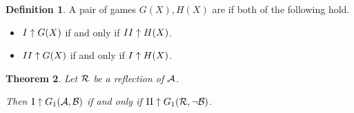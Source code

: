 \documentclass{amsart}
\theoremstyle{plain}
\newtheorem{theorem}{Theorem}
\theoremstyle{definition}
\newtheorem{definition}[theorem]{Definition}
\theoremstyle{remark}
\theoremstyle{plain}
\theoremstyle{definition}
\theoremstyle{remark}
\begin{document}
\begin{definition}
  A pair of games \(G(X),H(X)\) are  if both
  of the following hold.
  \begin{itemize}
    \item \(I\uparrow G(X)\) if and only if \(II\uparrow H(X)\).
    \item \(II\uparrow G(X)\) if and only if \(I\uparrow H(X)\).
  \end{itemize}
\end{definition}

\begin{theorem}
  Let \(\mathcal{R}\) be a reflection of \(\mathcal{A}\). 

  Then
  \(\mathrm{I}\uparrow G_{1}(\mathcal{A},\mathcal{B})\) if and only if
  \(\mathrm{II}\uparrow G_{1}(\mathcal{R},\neg\mathcal{B})\).
\end{theorem}
\end{document}
